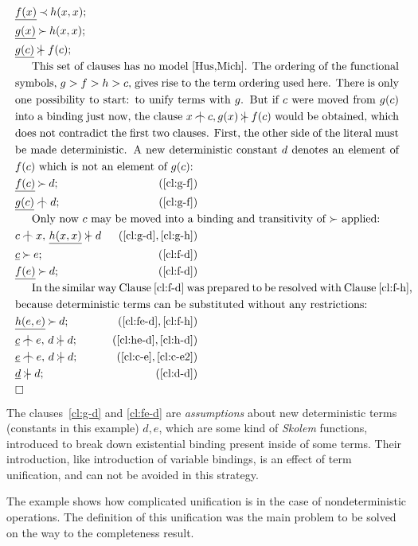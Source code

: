 \begin{example} \label {famous}
\begin{eqnarray}
\label{cl:f-h}  &\underline{f(x)}\Incl h(x,x); \\
\label{cl:g-h}  &\underline{g(x)}\Cont h(x,x);\\
\label{cl:g-f}  &\underline{g(c)}\notCont f(c);\\
\noalign
{This set of clauses has no model \cite{Hus,Mich}.  The ordering of 
the functional symbols, $g>f>h>c$, gives rise to the term ordering used here.
There is only one possibility to start: to unify terms with
$g$. But if $c$ were moved from $g(c)$ into a binding just now, the clause
\(x\notInt c, g(x)\notCont f(c)\) would be obtained, which does not
contradict the first two clauses.  First, the other side of the literal
must be made deterministic. A new deterministic constant $d$ denotes an element
of $f(c)$ which is not an element of $g(c)$:}
\label{cl:f-d}  &\underline{f(c)}\Cont d; &  (\ref {cl:g-f})\\
\label{cl:g-d}  &\underline{g(c)}\notInt d; &  (\ref {cl:g-f})\\
\noalign{Only now $c$ may be moved into a binding and transitivity of 
$\Cont$ applied:}
\label{cl:h-d}  & c\notInt x,\,\underline{h(x,x)}\notCont d &  (\ref{cl:g-d},\ref{cl:g-h})\\
\label{cl:c-e}   &\underline c\Cont e; &  (\ref {cl:f-d})\\
\label{cl:fe-d}   &\underline{f(e)}\Cont d; &  (\ref {cl:f-d})\\
\noalign{In the similar way Clause~\ref {cl:f-d} was prepared to be resolved
with Clause~\ref {cl:f-h}, because deterministic terms can be substituted
without any restrictions:}
\label{cl:he-d}  &\underline{h(e,e)}\Cont d;\quad &  (\ref {cl:fe-d},\ref{cl:f-h})\\
\label{cl:c-e2}  & \underline c\notInt e,\, d\notCont d; &  (\ref {cl:he-d},\ref{cl:h-d})\\
\label{cl:d-d}   & \underline e\notInt e,\,d\notCont d; &  (\ref {cl:c-e},\ref{cl:c-e2})\\
&\underline{d}\notCont d; &  (\ref {cl:d-d})\\
& \Box \vspace{-2ex}
\end{eqnarray}
The clauses~\ref {cl:g-d} and \ref{cl:fe-d} are {\em assumptions} about new
deterministic terms (constants in this example) $d,e$, which are some kind of
{\em Skolem} functions, introduced to break down existential binding present
inside of some terms.  Their introduction, like introduction of variable
bindings, is an effect of term unification, and can not be avoided in this
strategy.
\end{example}
%
The example shows how complicated unification is in the case of
nondeterministic operations.  The definition of this unification was the
main problem to be solved on the way to the completeness result.


